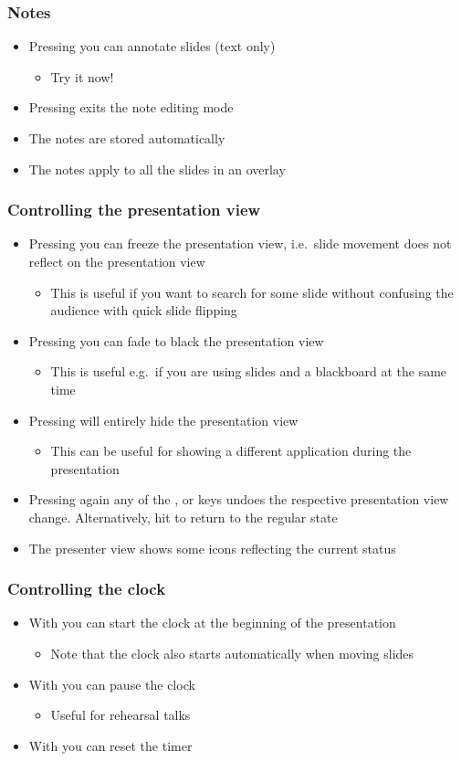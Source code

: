 \documentclass{beamer}
\newcommand{\singleitem}[1]{\begin{itemize}\item #1\end{itemize}}
\begin{document}
\begin{frame}
  \frametitle{Notes}
  \begin{itemize}
    \item Pressing  you can annotate slides (text only)
      \singleitem{Try it now!}
    \item Pressing \keys{\esc} exits the note editing mode
    \item The notes are stored automatically
    \item The notes apply to all the slides in an overlay
  \end{itemize}
\end{frame}

\begin{frame}
  \frametitle{Controlling the presentation view}
    \begin{itemize}
      \item Pressing  you can freeze the presentation view, i.e.\
        slide movement does not reflect on the presentation view
        \singleitem{This is useful if you want to search for some slide without
          confusing the audience with quick slide flipping}
      \item Pressing  you can fade to black the presentation view
        \singleitem{This is useful e.g.\ if you are using slides and a
          blackboard at the same time}
      \item Pressing  will entirely hide the presentation view
        \singleitem{This can be useful for showing a different application
          during the presentation}
      \item Pressing again any of the ,  or
         keys undoes the respective presentation view change.
        Alternatively, hit \keys{\esc} to return to the regular state
      \item The presenter view shows some icons reflecting the current status
    \end{itemize}
\end{frame}

\begin{frame}
  \frametitle{Controlling the clock}
  \begin{itemize}
    \item With  you can start the clock at the beginning of the
      presentation
      \singleitem{Note that the clock also starts automatically when moving
        slides}
    \item With  you can pause the clock
      \singleitem{Useful for rehearsal talks}
    \item With  you can reset the timer
  \end{itemize}
\end{frame}
\end{document}
